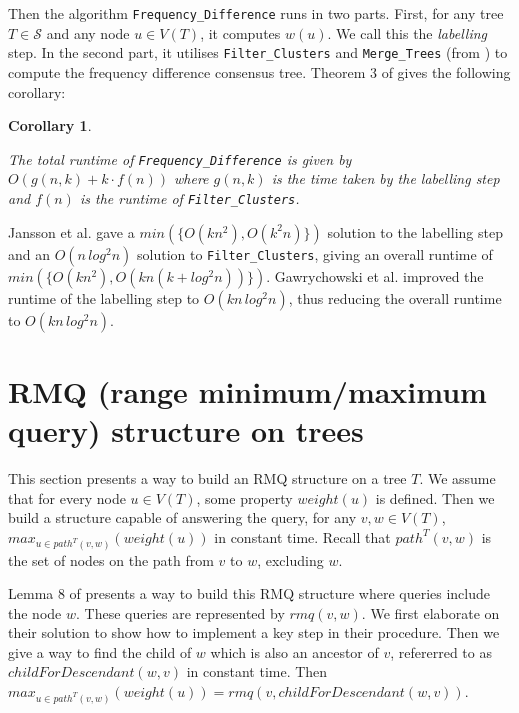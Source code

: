 \documentclass{article}
\newtheorem{freqdiffruntimecomponents}[incompatibility]{Corollary}
\begin{document}
    Then the algorithm \texttt{Frequency\_Difference} runs in two parts. First, for any tree $T \in \mathcal{S}$ and any node $u \in V(T)$, it computes $w(u)$. We call this the \textit{labelling} step. In the second part, it utilises \texttt{Filter\_Clusters} and \texttt{Merge\_Trees} (from \cite{jansson2016improved}) to compute the frequency difference consensus tree. Theorem 3 of \cite{jansson2018algorithms} gives the following corollary:
    \newline

    \begin{freqdiffruntimecomponents}
        \label{cor:freqdiffruntimecomponents}

        The total runtime of \texttt{Frequency\_Difference} is given by $O(g(n, k) + k \cdot f(n))$ where $g(n, k)$ is the time taken by the labelling step and $f(n)$ is the runtime of \texttt{Filter\_Clusters}.
    \end{freqdiffruntimecomponents}

    Jansson et al. \cite{jansson2018algorithms} gave a $min(\{O(kn^2), O(k^2n)\})$ solution to the labelling step and an $O(n\,log^2n)$ solution to \texttt{Filter\_Clusters}, giving an overall runtime of $min(\{O(kn^2), O(kn(k + log^2n))\})$. Gawrychowski et al. \cite{gawrychowski2017faster} improved the runtime of the labelling step to $O(kn\,log^2n)$, thus reducing the overall runtime to $O(kn\,log^2n)$.

    \section{RMQ (range minimum/maximum query) structure on trees}
    \label{sec:rmqstructure}

    This section presents a way to build an RMQ structure on a tree $T$. We assume that for every node $u \in V(T)$, some property $weight(u)$ is defined. Then we build a structure capable of answering the query, for any $v, w \in V(T)$, $max_{u \in path^{T}(v, w)}(weight(u))$ in constant time. Recall that $path^{T}(v, w)$ is the set of nodes on the path from $v$ to $w$, excluding $w$.

    Lemma 8 of \cite{jansson2018algorithms} presents a way to build this RMQ structure where queries include the node $w$. These queries are represented by $rmq(v, w)$. We first elaborate on their solution to show how to implement a key step in their procedure. Then we give a way to find the child of $w$ which is also an ancestor of $v$, refererred to as $childForDescendant(w, v)$ in constant time. Then $max_{u \in path^{T}(v, w)}(weight(u)) = rmq(v, childForDescendant(w, v))$.
\end{document}
